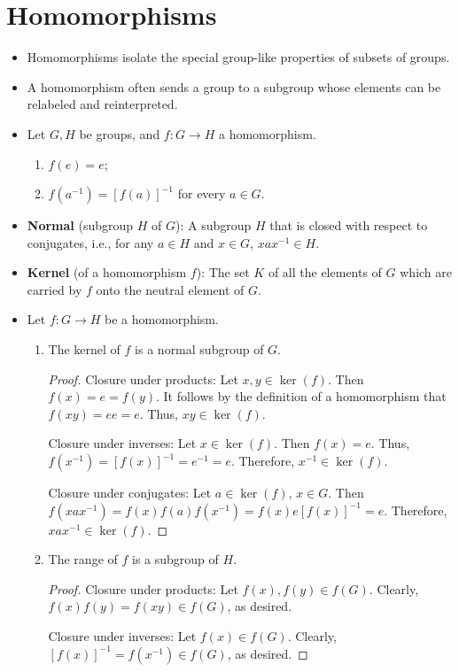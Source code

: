 \documentclass[../notes.tex]{subfiles}
\begin{document}
\chapter{Homomorphisms}
\begin{itemize}
    \item {}Homomorphisms isolate the special group-like properties of subsets of groups.
    \item A homomorphism often sends a group to a subgroup whose elements can be relabeled and reinterpreted.
    \item Let $G,H$ be groups, and $f:G\to H$ a homomorphism.
    \begin{theorem}\leavevmode
        \begin{enumerate}[label={\textup{(}\roman*\textup{)}}]
            \item $f(e)=e$;
            \item $f(a^{-1})=[f(a)]^{-1}$ for every $a\in G$.
        \end{enumerate}
    \end{theorem}
    \item \textbf{Normal} (subgroup $H$ of $G$): A subgroup $H$ that is closed with respect to conjugates, i.e., for any $a\in H$ and $x\in G$, $xax^{-1}\in H$.
    \item \textbf{Kernel} (of a homomorphism $f$): The set $K$ of all the elements of $G$ which are carried by $f$ onto the neutral element of $G$.
    \item Let $f:G\to H$ be a homomorphism.
    \begin{theorem}\leavevmode
        \begin{enumerate}[label={\textup{(}\roman*\textup{)}}]
            \item The kernel of $f$ is a normal subgroup of $G$.
            \begin{proof}
                Closure under products: Let $x,y\in\ker(f)$. Then $f(x)=e=f(y)$. It follows by the definition of a homomorphism that $f(xy)=ee=e$. Thus, $xy\in\ker(f)$.\par
                Closure under inverses: Let $x\in\ker(f)$. Then $f(x)=e$. Thus, $f(x^{-1})=[f(x)]^{-1}=e^{-1}=e$. Therefore, $x^{-1}\in\ker(f)$.\par
                Closure under conjugates: Let $a\in\ker(f)$, $x\in G$. Then $f(xax^{-1})=f(x)f(a)f(x^{-1})=f(x)e[f(x)]^{-1}=e$. Therefore, $xax^{-1}\in\ker(f)$.
            \end{proof}
            \item The range of $f$ is a subgroup of $H$.
            \begin{proof}
                Closure under products: Let $f(x),f(y)\in f(G)$. Clearly, $f(x)f(y)=f(xy)\in f(G)$, as desired.\par
                Closure under inverses: Let $f(x)\in f(G)$. Clearly, $[f(x)]^{-1}=f(x^{-1})\in f(G)$, as desired.
            \end{proof}
        \end{enumerate}
    \end{theorem}
\end{itemize}
\end{document}
